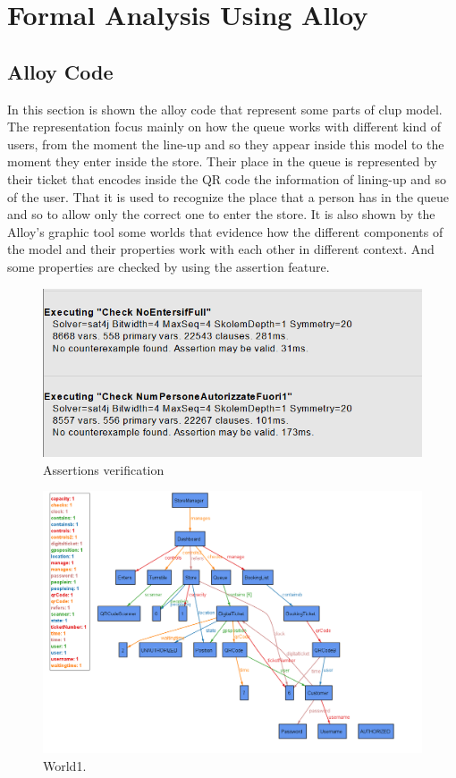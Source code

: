 \chapter{Formal Analysis Using Alloy}

\section{Alloy Code}

In this section is shown the alloy code that represent some parts of \gls{clup} model. The representation focus mainly on how the queue works with different kind of users, from the moment the line-up and so they appear inside this model to the moment they enter inside the store. Their place in the queue is represented by their ticket that encodes inside the QR code the information of lining-up and so of the user. That it is used to recognize the place that a person has in the queue and so to allow only the correct one to enter the store.
It is also shown by the Alloy’s graphic tool some worlds that evidence how the different components of the model and their properties work with each other in different context. And some properties are checked by using the assertion feature. 




\begin{figure}[H]
	\centering
	\includegraphics[width=\textwidth]{images/Assertions.png}
	\caption{Assertions verification}
	\label{figure: Assertions verification}
\end{figure}

\begin{figure}
	\includegraphics[width=1.0\textwidth]{images/AlloyW1.png}
	\caption{World1.}
	\label{figure: World1}
\end{figure}

